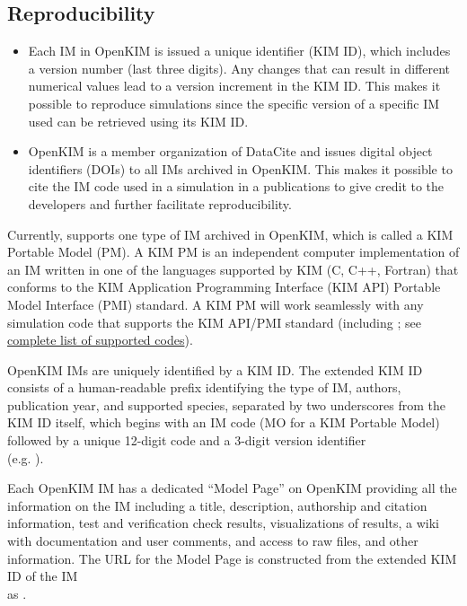 \subsection*{Reproducibility}
\begin{itemize}
\item Each IM in OpenKIM is issued a unique identifier (KIM ID), which includes
a version number (last three digits). Any changes that can result in different
numerical values lead to a version increment in the KIM ID. This makes it
possible to reproduce simulations since the specific version of a specific IM
used can be retrieved using its KIM ID.

\item OpenKIM is a member organization of DataCite and issues digital object
identifiers (DOIs) to all IMs archived in OpenKIM. This makes it possible to cite
the IM code used in a simulation in a publications to give credit to the developers
and further facilitate reproducibility.
\end{itemize}

Currently, \D supports one type of IM archived in OpenKIM, which  is called a
KIM Portable Model (PM). A KIM PM is an independent computer implementation
of an IM written in one of the languages supported by KIM (C, C++, Fortran) that
conforms to the KIM Application Programming Interface (KIM API) Portable Model
Interface (PMI) standard. A KIM PM will work seamlessly with any simulation code
that supports the KIM API/PMI standard (including \D; see \href{https://openkim.org/projects-using-kim/}{complete list
	of supported codes}).

OpenKIM IMs are uniquely identified by a KIM ID. The extended KIM ID consists of
a human-readable prefix identifying the type of IM, authors, publication year, and
supported species, separated by two underscores from the KIM ID itself, which
begins with an IM code (MO for a KIM Portable Model) followed by a unique 12-digit
code and a 3-digit version identifier \\ (e.g. ).

Each OpenKIM IM has a dedicated ``Model Page'' on OpenKIM providing all the
information on the IM including a title, description, authorship and citation
information, test and verification check results, visualizations of results, a
wiki with documentation and user comments, and access to raw files, and other
information. The URL for the Model Page is constructed from the extended KIM
ID of the IM \\ as .

